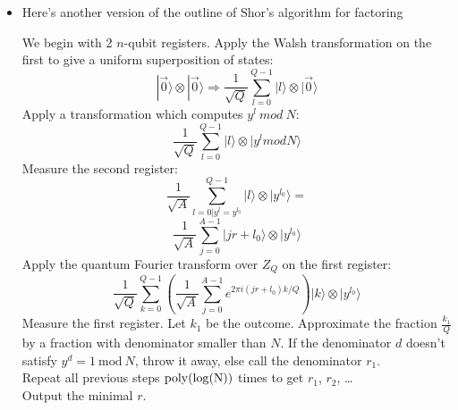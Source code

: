 \documentclass{article}
\def\pagedone{\newpage}
\def\ket#1{|{#1}\rangle}
\newcommand {\ra} {\rangle}
\def\tensor{\otimes}
\begin{document}
\begin{itemize}
\pagedone

\item Here's another version of the outline of Shor's algorithm for factoring

We begin with 2 $n$-qubit registers.  Apply the Walsh transformation on the first to give a uniform superposition of states: 
$$\ket{\stackrel{\rightarrow}{0}}\tensor\ket{\stackrel{\rightarrow}{0}}
\Rightarrow\frac{1}{\sqrt{Q}}\sum_{l=0}^{Q-1} |l\ra\otimes |\stackrel{\rightarrow}{0}\ra$$
Apply a transformation which computes $y^l~ mod ~N$:
$$\frac{1}{\sqrt{Q}}\sum_{l=0}^{Q-1} |l\ra\otimes|y^l mod N\ra $$
Measure the second register:
$$\frac{1}{\sqrt{A}}\sum_{l=0|y^l=y^{l_0}}^{Q-1} |l\ra\otimes|y^{l_0}\ra=$$
$$\frac{1}{\sqrt{A}}\sum_{j=0}^{A-1} |jr+l_0\ra\otimes|y^{l_0}\ra$$
\pagedone
Apply the quantum Fourier transform over $Z_Q$ on the first register:
$$\frac{1}{\sqrt{Q}}\sum_{k=0}^{Q-1}\left(\frac{1}{\sqrt{A}} 
\sum_{j=0}^{A-1} e^{2\pi i (jr+l_0)k/Q}\right)
|k\ra\otimes|y^{l_0}\ra$$
Measure the first register.  Let $k_1$ be the outcome. Approximate the fraction $\frac{k_1}{Q}$ by a fraction with denominator smaller than $N$.
If the denominator $d$ doesn't satisfy $y^d=1\ \mathrm{mod} ~N$, throw it away, else call the denominator $r_1$.\\
Repeat all previous steps $\rm{poly}(\rm{log}(N))$ times to get $r_1$, $r_2$, \ldots \\
Output the minimal $r$. 

\end{itemize}
\pagedone
\end{document}
